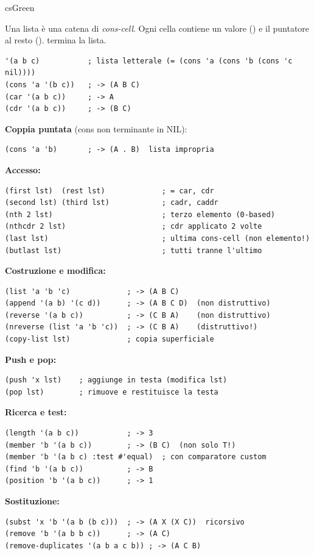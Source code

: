 \begin{refbox}[Liste]{csGreen}
\label{sec:liste}

Una lista è una catena di \textit{cons-cell}. Ogni cella contiene
un valore () e il puntatore al resto ().
 termina la lista.

\begin{lstlisting}
'(a b c)           ; lista letterale (= (cons 'a (cons 'b (cons 'c nil))))
(cons 'a '(b c))   ; -> (A B C)
(car '(a b c))     ; -> A
(cdr '(a b c))     ; -> (B C)
\end{lstlisting}

\textbf{Coppia puntata} (cons non terminante in NIL):\nopagebreak
\begin{lstlisting}
(cons 'a 'b)       ; -> (A . B)  lista impropria
\end{lstlisting}

\textbf{Accesso:}\nopagebreak
\begin{lstlisting}
(first lst)  (rest lst)             ; = car, cdr
(second lst) (third lst)            ; cadr, caddr
(nth 2 lst)                         ; terzo elemento (0-based)
(nthcdr 2 lst)                      ; cdr applicato 2 volte
(last lst)                          ; ultima cons-cell (non elemento!)
(butlast lst)                       ; tutti tranne l'ultimo
\end{lstlisting}

\textbf{Costruzione e modifica:}\nopagebreak
\begin{lstlisting}
(list 'a 'b 'c)             ; -> (A B C)
(append '(a b) '(c d))      ; -> (A B C D)  (non distruttivo)
(reverse '(a b c))          ; -> (C B A)    (non distruttivo)
(nreverse (list 'a 'b 'c))  ; -> (C B A)    (distruttivo!)
(copy-list lst)             ; copia superficiale
\end{lstlisting}

\textbf{Push e pop:}\nopagebreak
\begin{lstlisting}
(push 'x lst)    ; aggiunge in testa (modifica lst)
(pop lst)        ; rimuove e restituisce la testa
\end{lstlisting}

\textbf{Ricerca e test:}\nopagebreak
\begin{lstlisting}
(length '(a b c))           ; -> 3
(member 'b '(a b c))        ; -> (B C)  (non solo T!)
(member 'b '(a b c) :test #'equal)  ; con comparatore custom
(find 'b '(a b c))          ; -> B
(position 'b '(a b c))      ; -> 1
\end{lstlisting}

\textbf{Sostituzione:}\nopagebreak
\begin{lstlisting}
(subst 'x 'b '(a b (b c)))  ; -> (A X (X C))  ricorsivo
(remove 'b '(a b b c))      ; -> (A C)
(remove-duplicates '(a b a c b)) ; -> (A C B)
\end{lstlisting}

\end{refbox}

